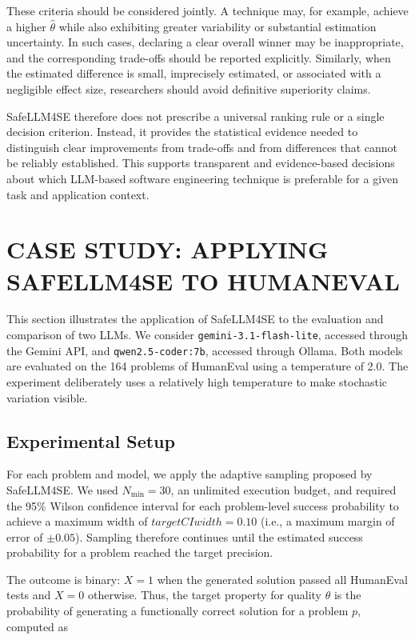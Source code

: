 \documentclass{IEEEcsmag}
\begin{document}
These criteria should be considered jointly. A technique may, for example, achieve a higher $\hat{\theta}$ while also exhibiting greater variability or substantial estimation uncertainty. In such cases, declaring a clear overall winner may be inappropriate, and the corresponding trade-offs should be reported explicitly. Similarly, when the estimated difference is small,
imprecisely estimated, or associated with a negligible effect size, researchers should avoid definitive superiority claims.


SafeLLM4SE therefore does not prescribe a universal ranking rule or a single decision criterion. Instead, it provides the statistical evidence needed to distinguish clear improvements from trade-offs and from differences that cannot be reliably established. This supports transparent and evidence-based decisions about which LLM-based software engineering technique is preferable for a given task and application context.


\section{CASE STUDY: APPLYING SAFELLM4SE TO HUMANEVAL}
\label{section:case-study}

This section illustrates the application of SafeLLM4SE to the evaluation and comparison of two LLMs. We consider \texttt{gemini-3.1-flash-lite}, accessed through the Gemini API, and \texttt{qwen2.5-coder:7b}, accessed through Ollama. Both models are evaluated on the 164 problems of HumanEval using a temperature of 2.0. The experiment deliberately uses a relatively high temperature to make stochastic variation visible.

\subsection{Experimental Setup}
\label{subsection:case-study:setup}

For each problem and model, we apply the adaptive sampling proposed by SafeLLM4SE. We used $N_{\min}=30$, an unlimited execution budget, and required the 95\% Wilson confidence interval for each problem-level success probability to achieve a maximum width of $targetCIwidth = 0.10$ (i.e., a maximum margin of error of $\pm 0.05$). Sampling therefore continues until the estimated success probability for a problem reached the target precision. 

The outcome is binary: $X=1$ when the generated solution passed all HumanEval tests and $X=0$ otherwise. Thus, the target property for quality $\theta$ is the probability of generating a functionally correct solution for a problem $p$, computed as
\end{document}
